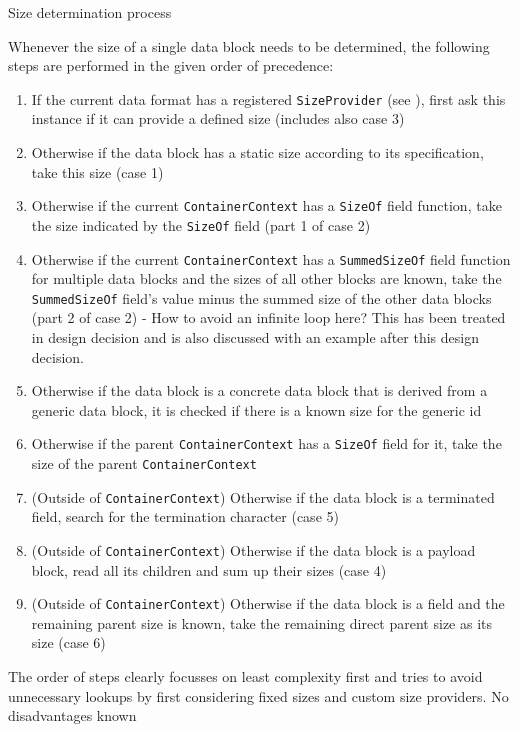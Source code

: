 {%
Size determination process
}
{%
  Whenever the size of a single data block needs to be determined, the following steps are performed in the given order of precedence:
\begin{enumerate}
\item If the current data format has a registered \texttt{SizeProvider} (see ), first ask this instance if it can provide a defined size (includes also case 3)
\item Otherwise if the data block has a static size according to its specification, take this size (case 1)
\item Otherwise if the current \texttt{ContainerContext} has a \texttt{SizeOf} field function, take the size indicated by the \texttt{SizeOf} field (part 1 of case 2)
\item Otherwise if the current \texttt{ContainerContext} has a \texttt{SummedSizeOf} field function for multiple data blocks and the sizes of all other blocks are known, take the \texttt{SummedSizeOf} field's value minus the summed size of the other data blocks (part 2 of case 2) - How to avoid an infinite loop here? This has been treated in design decision  and is also discussed with an example after this design decision.
\item Otherwise if the data block is a concrete data block that is derived from a generic data block, it is checked if there is a known size for the generic id  
\item Otherwise if the parent \texttt{ContainerContext} has a \texttt{SizeOf} field for it, take the size of the parent \texttt{ContainerContext}
\item (Outside of \texttt{ContainerContext}) Otherwise if the data block is a terminated field, search for the termination character (case 5)
\item (Outside of \texttt{ContainerContext}) Otherwise if the data block is a payload block, read all its children and sum up their sizes (case 4)
\item (Outside of \texttt{ContainerContext}) Otherwise if the data block is a field and the remaining parent size is known, take the remaining direct parent size as its size (case 6)
\end{enumerate}
}
{%
The order of steps clearly focusses on least complexity first and tries to avoid unnecessary lookups by first considering fixed sizes and custom size providers.
}
{%
No disadvantages known
}


